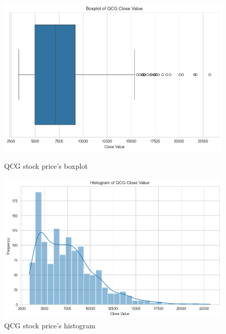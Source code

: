 \documentclass{ieeeojies}
\begin{document}
\begin{figure}[H]
  \centering
  \begin{minipage}{0.23\textwidth}
  \centering
  \includegraphics[width=1\textwidth]{bibliography/Figure/QCGboxplot.png}
  \caption{QCG stock price's boxplot}
  \label{fig:1}
  \end{minipage}
  \hfill
  \begin{minipage}{0.23\textwidth}
  \centering
  \includegraphics[width=1\textwidth]{bibliography/Figure/QCGhist.png}
  \caption{QCG stock price's histogram}
  \label{fig:2}
  \end{minipage}
\end{figure}
\end{document}
